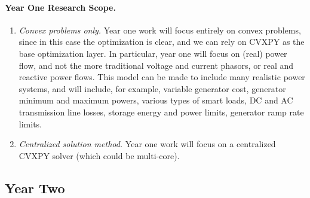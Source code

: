 \documentclass[12pt]{article}
\begin{document}
\paragraph{Year One Research Scope.}
\begin{enumerate}
\item \emph{Convex problems only.}
Year one work will focus entirely on convex problems,
since in this case the optimization is clear,
and we can rely on CVXPY as the base optimization layer.
In particular, year one will focus on (real) power flow,
and not the more traditional voltage and current phasors,
or real and reactive power flows.
This model can be made to include many realistic power systems,
and will include, for example, variable generator cost,
generator minimum and maximum powers,
various types of smart loads, DC and AC transmission line losses,
storage energy and power limits,
generator ramp rate limits.


\item \emph{Centralized solution method.}
Year one work will focus on a centralized CVXPY solver 
(which could be multi-core).
\end{enumerate}

\subsection{Year Two}
\end{document}
